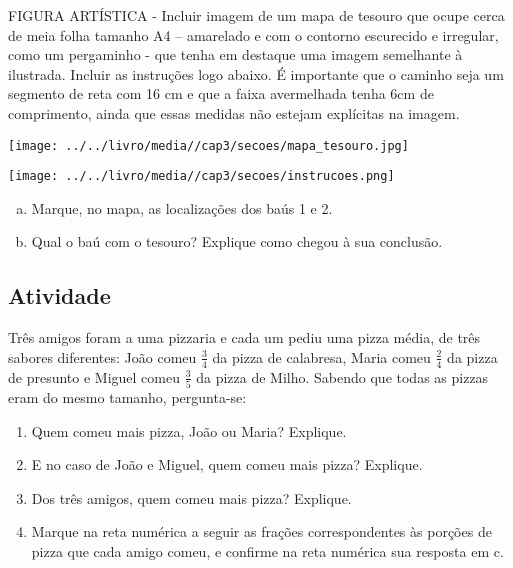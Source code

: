 \begin{imagem*}[breakable]{}{}  FIGURA ARTÍSTICA - Incluir imagem de um mapa de tesouro que ocupe cerca de meia folha tamanho A4 – amarelado e com o contorno escurecido e irregular, como um pergaminho - que tenha em destaque uma imagem semelhante à ilustrada. Incluir as instruções logo abaixo. É importante que o caminho seja um segmento de reta com 16 cm e que a faixa avermelhada tenha 6cm de comprimento, ainda que essas medidas não estejam explícitas na imagem.  

\texttt{[image: ../../livro/media//cap3/secoes/mapa\_tesouro.jpg]}  

\texttt{[image: ../../livro/media//cap3/secoes/instrucoes.png]}  

\end{imagem*}

\begin{enumerate}[a)]
 \item Marque, no mapa, as localizações dos baús 1 e 2.
 \item Qual o baú com o tesouro? Explique como chegou à sua conclusão. 
\end{enumerate}

\subsection{Atividade}

Três amigos foram a uma pizzaria e cada um pediu uma pizza média, de três sabores diferentes: João comeu $\frac{3}{4}$ da pizza de calabresa, Maria comeu  $\frac{2}{4}$ da pizza de presunto e Miguel comeu $\frac{3}{5}$ da pizza de Milho. Sabendo que todas as pizzas eram do mesmo tamanho, pergunta-se:
\begin{enumerate} [\quad a)] %
  \item     Quem comeu mais pizza, João ou Maria? Explique.
  \item     E no caso de João e Miguel, quem comeu mais pizza? Explique.
  \item     Dos três amigos, quem comeu mais pizza? Explique.
  \item     Marque na reta numérica a seguir as frações correspondentes às porções de pizza que cada amigo comeu, e confirme na reta numérica sua resposta em c.
\end{enumerate} %

\begin{center}
\end{center}


